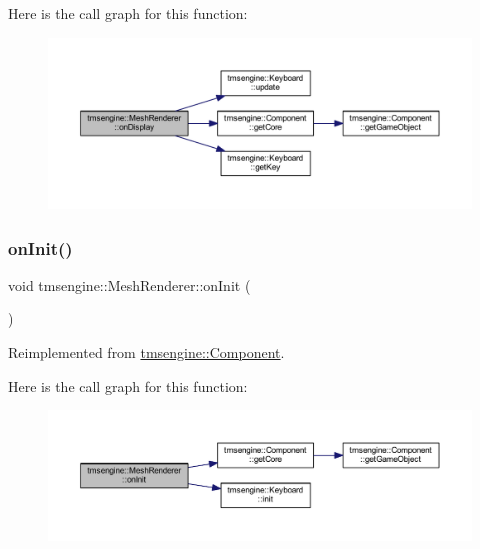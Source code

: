 Here is the call graph for this function\+:\nopagebreak
\begin{figure}[H]
\begin{center}
\leavevmode
\includegraphics[width=350pt]{classtmsengine_1_1_mesh_renderer_adf77a2164ad1c92e4a310b99624b9fb5_cgraph}
\end{center}
\end{figure}
\mbox{\label{classtmsengine_1_1_mesh_renderer_a63ea3f394ba6678a6044068dd4253c97}} 
\subsubsection{\texorpdfstring{on\+Init()}{onInit()}}
{\footnotesize\ttfamily void tmsengine\+::\+Mesh\+Renderer\+::on\+Init (\begin{DoxyParamCaption}{ }\end{DoxyParamCaption})\hspace{0.3cm}{\ttfamily [virtual]}}



Reimplemented from \hyperlink{classtmsengine_1_1_component_ae992e9b0c98b569eba13d0274089bc18}{tmsengine\+::\+Component}.

Here is the call graph for this function\+:\nopagebreak
\begin{figure}[H]
\begin{center}
\leavevmode
\includegraphics[width=350pt]{classtmsengine_1_1_mesh_renderer_a63ea3f394ba6678a6044068dd4253c97_cgraph}
\end{center}
\end{figure}
\mbox{\label{classtmsengine_1_1_mesh_renderer_a1f1e2e0502438b6709e27a0b39c5ae9b}} 
